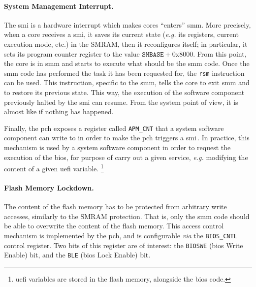 \paragraph{System Management Interrupt.}

The \ac{smi} is a hardware interrupt which makes cores ``enters'' \ac{smm}.
%
More precisely, when a core receives a \ac{smi}, it saves its current state
(\emph{e.g.} its registers, current execution mode, etc.) in the SMRAM, then it
reconfigures itself;
%
in particular, it sets its program counter register to the value
$\mathtt{SMBASE} + \mathrm{0x8000}$.
%
From this point, the core is in \ac{smm} and starts to execute what should
be the \ac{smm} code.
%
Once the \ac{smm} code has performed the task it has been requested for, the
\texttt{rsm} instruction can be used.
%
This instruction, specific to the \ac{smm}, tells the core to exit \ac{smm}
and to restore its previous state.
%
This way, the execution of the software component previously halted by the
\ac{smi} can resume.
%
From the system point of view, it is almost like if nothing has happened.

Finally, the \ac{pch} exposes a register called \texttt{APM\_CNT} that a system
software component can write to in order to make the \ac{pch} triggers a
\ac{smi}\,\cite{intel2012pch}.
%
In practice, this mechanism is used by a system software component in order to
request the execution of the \ac{bios}, for purpose of carry out a given
service, \emph{e.g.} modifying the content of a given \ac{uefi}
variable.
%
\footnote{\ac{uefi} variables are stored in the flash memory, alongside
the \ac{bios} code.}

\paragraph{Flash Memory Lockdown.}
%
The content of the flash memory has to be protected from arbitrary write
accesses, similarly to the SMRAM protection.
%
That is, only the \ac{smm} code should be able to overwrite the content of the
flash memory.
%
This access control mechanism is implemented by the \ac{pch}, and is
configurable \emph{via} the \texttt{BIOS\_CNTL} control register.
%
Two bits of this register are of interest: the \texttt{BIOSWE} (\ac{bios} Write
Enable) bit, and the \texttt{BLE} (\ac{bios} Lock Enable) bit.

